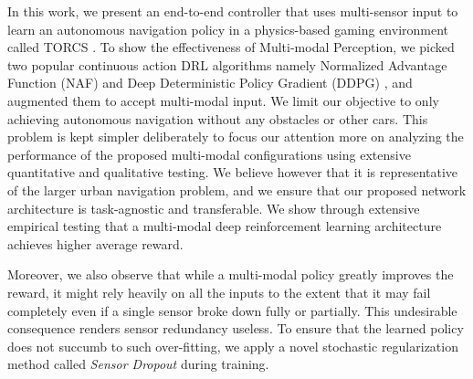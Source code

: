 \documentclass[../thesis.tex]{subfiles}
\begin{document}
In this work, we present an end-to-end controller that uses multi-sensor input to learn an autonomous navigation policy in a physics-based gaming environment called TORCS \cite{wymann2000torcs}. To show the effectiveness of Multi-modal Perception, we picked two popular continuous action DRL algorithms namely Normalized Advantage Function (NAF) \cite{CDQN} and Deep Deterministic Policy Gradient (DDPG) \cite{DBLP:journals/corr/LillicrapHPHETS15}, and augmented them to accept multi-modal input. We limit our objective to only achieving autonomous navigation without any obstacles or other cars. This problem is kept simpler deliberately to focus our attention more on analyzing the performance of the proposed multi-modal configurations using extensive quantitative and qualitative testing. We believe however that it is representative of the larger urban navigation problem, and we ensure that our proposed network architecture is task-agnostic and transferable. We show through extensive empirical testing that a multi-modal deep reinforcement learning architecture achieves higher average reward.

Moreover, we also observe that while a multi-modal policy greatly improves the reward, it might rely heavily on all the inputs to the extent that it may fail completely even if a single sensor broke down fully or partially. This undesirable consequence renders sensor redundancy useless. To ensure that the learned policy does not succumb to such over-fitting, we apply a novel stochastic regularization method called \emph{Sensor Dropout} during training. 
\end{document}
